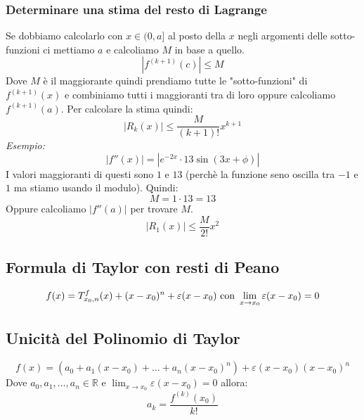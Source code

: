 \documentclass[10pt, a4paper]{article}
\begin{document}
        \subsubsection{Determinare una stima del resto di Lagrange}
            Se dobbiamo calcolarlo con $x\in(0,a]$ al posto della $x$ negli argomenti delle sotto-funzioni ci mettiamo $a$ e calcoliamo $M$ in base a quello.
            \begin{equation*}
                \left|f^{(k+1)}(c)\right|\leq M
            \end{equation*}
            Dove $M$ è il maggiorante quindi prendiamo tutte le "sotto-funzioni" di $f^{(k+1)}(x)$ e combiniamo tutti i maggioranti tra di loro oppure calcoliamo $f^{(k+1)}(a)$. Per calcolare la stima quindi:
            \begin{equation*}
                \left|R_k(x)\right|\leq \frac{M}{(k+1)!}x^{k+1}
            \end{equation*}
            \textit{Esempio:}
            \begin{equation*}
                \left|f''(x)\right|=\left|e^{-2x}\cdot 13\sin(3x+\phi)\right|
            \end{equation*}
            I valori maggioranti di questi sono $1$ e $13$ (perchè la funzione seno oscilla tra $-1$ e $1$ ma stiamo usando il modulo). Quindi:
            \begin{equation*}
                M = 1\cdot 13 = 13
            \end{equation*}
            Oppure calcoliamo $\left|f''(a)\right|$ per trovare $M$.
            \begin{equation*}
                \left|R_1(x)\right|\leq \frac{M}{2!}x^2
            \end{equation*}
    \subsection{Formula di Taylor con resti di Peano}
        \begin{equation*}
                f(x)= \taylor{f}{x_0}{n}(x) + (x-x_0)^n + \varepsilon(x-x_0) \text{ con } \lim_{x\rightarrow x_0} \varepsilon(x-x_0) = 0
        \end{equation*}
    \subsection{Unicità del Polinomio di Taylor}
    \begin{equation*}
        f(x)=(a_0+a_1(x-x_0)+\ldots+a_n(x-x_0)^n)+\varepsilon(x-x_0)(x-x_0)^n
    \end{equation*}
    Dove $a_0,a_1,\ldots,a_n\in\mathbb{R}$ e $\lim_{x\rightarrow x_0}\varepsilon(x-x_0)=0$ allora:
    \begin{equation*}
        a_k = \frac{f^{(k)}(x_0)}{k!}
    \end{equation*}
\newpage
\end{document}
